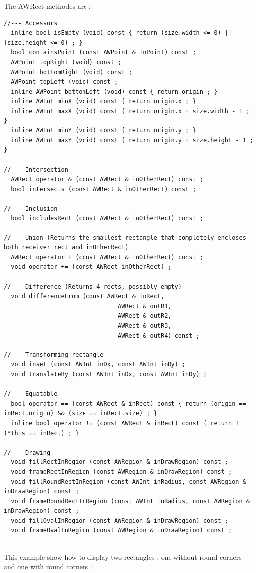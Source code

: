 \documentclass[a4paper,11pt]{extarticle}
\begin{document}
The AWRect methodes are :
\begin{lstlisting}[language=Arduinonl]
//--- Accessors
  inline bool isEmpty (void) const { return (size.width <= 0) || (size.height <= 0) ; }
  bool containsPoint (const AWPoint & inPoint) const ;
  AWPoint topRight (void) const ;
  AWPoint bottomRight (void) const ;
  AWPoint topLeft (void) const ;
  inline AWPoint bottomLeft (void) const { return origin ; }
  inline AWInt minX (void) const { return origin.x ; }
  inline AWInt maxX (void) const { return origin.x + size.width - 1 ; }
  inline AWInt minY (void) const { return origin.y ; }
  inline AWInt maxY (void) const { return origin.y + size.height - 1 ; }

//--- Intersection
  AWRect operator & (const AWRect & inOtherRect) const ;
  bool intersects (const AWRect & inOtherRect) const ;

//--- Inclusion
  bool includesRect (const AWRect & inOtherRect) const ;

//--- Union (Returns the smallest rectangle that completely encloses both receiver rect and inOtherRect)
  AWRect operator + (const AWRect & inOtherRect) const ;
  void operator += (const AWRect inOtherRect) ;

//--- Difference (Returns 4 rects, possibly empty)
  void differenceFrom (const AWRect & inRect,
                                AWRect & outR1,
                                AWRect & outR2,
                                AWRect & outR3,
                                AWRect & outR4) const ;

//--- Transforming rectangle
  void inset (const AWInt inDx, const AWInt inDy) ;
  void translateBy (const AWInt inDx, const AWInt inDy) ;

//--- Equatable
  bool operator == (const AWRect & inRect) const { return (origin == inRect.origin) && (size == inRect.size) ; }
  inline bool operator != (const AWRect & inRect) const { return ! (*this == inRect) ; }

//--- Drawing
  void fillRectInRegion (const AWRegion & inDrawRegion) const ;
  void frameRectInRegion (const AWRegion & inDrawRegion) const ;
  void fillRoundRectInRegion (const AWInt inRadius, const AWRegion & inDrawRegion) const ;
  void frameRoundRectInRegion (const AWInt inRadius, const AWRegion & inDrawRegion) const ;
  void fillOvalInRegion (const AWRegion & inDrawRegion) const ;
  void frameOvalInRegion (const AWRegion & inDrawRegion) const ;
\end{lstlisting}

~\\This example show how to display two rectangles : one without round corners and one with round corners :
\end{document}
